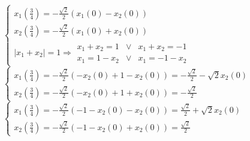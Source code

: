 \documentclass[a4paper,11pt]{article}
\begin{document}
$\begin{cases}
x_1(\frac34)=-\frac{\sqrt{2}}{2}(x_1(0)-x_2(0))\\
x_2(\frac34)=-\frac{\sqrt{2}}{2}(x_1(0)+x_2(0))\\
|x_1+x_2|=1\Rightarrow \begin{array}{ccc}x_1+x_2=1&\vee&x_1+x_2=-1 \\ x_1=1-x_2&\vee& x_1=-1-x_2\end{array}
\end{cases}$\\
$\begin{cases}
x_1(\frac34)=-\frac{\sqrt{2}}{2}(-x_2(0)+1-x_2(0))=-\frac{\sqrt{2}}{2}-\sqrt{2}x_2(0)\\
x_2(\frac34)=-\frac{\sqrt{2}}{2}(-x_2(0)+1+x_2(0))=-\frac{\sqrt{2}}{2}
\end{cases}$\\
$\begin{cases}
x_1(\frac34)=-\frac{\sqrt{2}}{2}(-1-x_2(0)-x_2(0))=\frac{\sqrt{2}}{2}+\sqrt{2}x_2(0)\\
x_2(\frac34)=-\frac{\sqrt{2}}{2}(-1-x_2(0)+x_2(0))=\frac{\sqrt{2}}{2}
\end{cases}$\\

\begin{figure}[H]
\end{figure}
\end{document}
